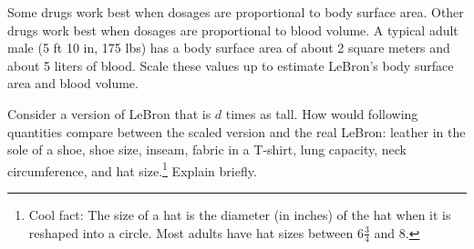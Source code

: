\begin{prob}
Some drugs work best when dosages are proportional to body surface area.  Other drugs work best when dosages are proportional to blood volume.  A typical adult male (5 ft 10 in, 175 lbs)  has a body surface area of about 2 square meters and about 5 liters of blood.  Scale these values up to estimate LeBron's body surface area and blood volume.  
\end{prob}


\begin{prob}
Consider a version of LeBron that is $d$ times as tall.  How would following quantities compare between the scaled version and the real LeBron:   leather in the sole of a shoe, shoe size, inseam, fabric in a T-shirt, lung capacity, neck circumference, and hat size.\footnote{Cool fact:  The size of a hat is the diameter (in inches) of the hat when it is reshaped into a circle.  Most adults have hat sizes between $6\frac{3}{4}$ and $8$.}  Explain briefly.  
\end{prob}


